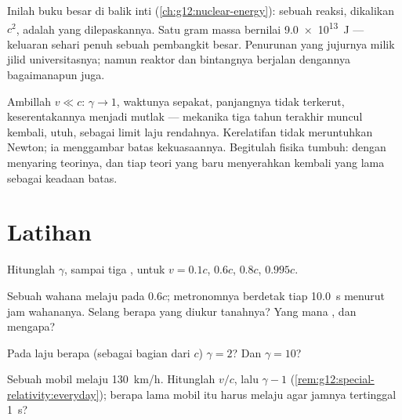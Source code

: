 \begin{remark}\label{rem:g12:special-relativity:emc2seen}
Inilah buku besar di balik  inti (\cref{ch:g12:nuclear-energy}):
 sebuah reaksi, dikalikan $c^2$, adalah  yang dilepaskannya. Satu
gram massa bernilai \qty{9.0e13}{J} --- keluaran sehari penuh sebuah pembangkit
besar. Penurunan yang jujurnya milik jilid universitasnya; namun
reaktor dan bintangnya berjalan dengannya bagaimanapun juga.
\end{remark}

\begin{remark}\label{rem:g12:special-relativity:newton}
Ambillah $v \ll c$: $\gamma \to 1$, waktunya sepakat, panjangnya tidak terkerut,
keserentakannya menjadi mutlak --- mekanika tiga tahun terakhir
muncul kembali, utuh, sebagai limit laju rendahnya. Kerelatifan tidak meruntuhkan
Newton; ia menggambar batas kekuasaannya. Begitulah fisika tumbuh: dengan
menyaring teorinya, dan tiap teori yang baru menyerahkan kembali yang lama sebagai keadaan batas.
\end{remark}

\section{Latihan}

\begin{exercise}[$\star$]\label{exo:g12:special-relativity:1}
Hitunglah $\gamma$, sampai tiga , untuk $v = 0.1c$, $0.6c$, $0.8c$, $0.995c$.
\end{exercise}

\begin{exercise}[$\star$]\label{exo:g12:special-relativity:2}
Sebuah wahana melaju pada $0.6c$; metronomnya berdetak tiap \qty{10.0}{s} menurut jam
wahananya. Selang berapa yang diukur tanahnya? Yang mana , dan mengapa?
\end{exercise}

\begin{exercise}[$\star$]\label{exo:g12:special-relativity:3}
Pada laju berapa (sebagai bagian dari $c$) $\gamma = 2$? Dan $\gamma = 10$?
\end{exercise}

\begin{exercise}[$\star$]\label{exo:g12:special-relativity:4}
Sebuah mobil melaju \qty{130}{km/h}. Hitunglah $v/c$, lalu $\gamma - 1$
(\cref{rem:g12:special-relativity:everyday}); berapa lama mobil itu harus melaju agar
jamnya tertinggal \qty{1}{s}?
\end{exercise}

